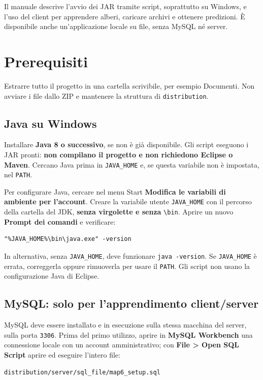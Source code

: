 \documentclass[11pt,a4paper]{article}
\begin{document}

Il manuale descrive l'avvio dei JAR tramite script, soprattutto su Windows,
e l'uso del client per apprendere alberi, caricare archivi e ottenere predizioni.
È disponibile anche un'applicazione locale su file, senza MySQL né server.

\section*{Prerequisiti}

Estrarre tutto il progetto in una cartella scrivibile, per esempio Documenti.
Non avviare i file dallo ZIP e mantenere la struttura di \texttt{distribution}.

\subsection*{Java su Windows}

Installare \textbf{Java 8 o successivo}, se non è già disponibile.
Gli script eseguono i JAR pronti: \textbf{non compilano il progetto e non
richiedono Eclipse o Maven}. Cercano Java prima in \texttt{JAVA\_HOME} e,
se questa variabile non è impostata, nel \texttt{PATH}.

Per configurare Java, cercare nel menu Start \textbf{Modifica le variabili di
ambiente per l'account}. Creare la variabile utente \texttt{JAVA\_HOME} con
il percorso della cartella del JDK, \textbf{senza virgolette e senza}
\texttt{\textbackslash bin}. Aprire un nuovo \textbf{Prompt dei comandi} e verificare:
\begin{lstlisting}
"%JAVA_HOME%\bin\java.exe" -version
\end{lstlisting}

In alternativa, senza \texttt{JAVA\_HOME}, deve funzionare \texttt{java -version}.
Se \texttt{JAVA\_HOME} è errata, correggerla oppure rimuoverla per usare il
\texttt{PATH}. Gli script non usano la configurazione Java di Eclipse.

\subsection*{MySQL: solo per l'apprendimento client/server}

MySQL deve essere installato e in esecuzione sulla stessa macchina del server,
sulla porta \texttt{3306}. Prima del primo utilizzo, aprire in
\textbf{MySQL Workbench} una connessione locale con un account amministrativo;
con \textbf{File > Open SQL Script} aprire ed eseguire l'intero file:
\begin{lstlisting}
distribution/server/sql_file/map6_setup.sql
\end{lstlisting}
\end{document}
